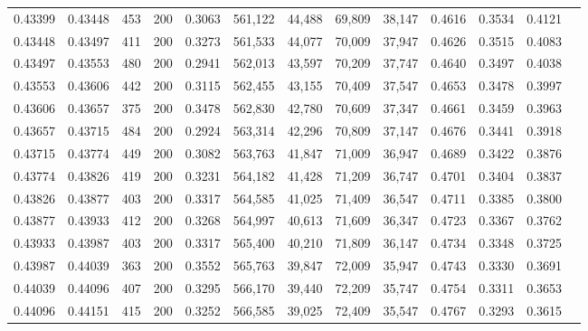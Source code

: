 \begin{tabular}{rrrrrrrrrrrrr}
0.43399 & 0.43448 &    453 & 200 &                                     0.3063 & 561,122 &  44,488 &  69,809 &  38,147 & 0.4616 & 0.3534 & 0.4121 \\
0.43448 & 0.43497 &    411 & 200 &                                     0.3273 & 561,533 &  44,077 &  70,009 &  37,947 & 0.4626 & 0.3515 & 0.4083 \\
0.43497 & 0.43553 &    480 & 200 &                                     0.2941 & 562,013 &  43,597 &  70,209 &  37,747 & 0.4640 & 0.3497 & 0.4038 \\
0.43553 & 0.43606 &    442 & 200 &                                     0.3115 & 562,455 &  43,155 &  70,409 &  37,547 & 0.4653 & 0.3478 & 0.3997 \\
0.43606 & 0.43657 &    375 & 200 &                                     0.3478 & 562,830 &  42,780 &  70,609 &  37,347 & 0.4661 & 0.3459 & 0.3963 \\
0.43657 & 0.43715 &    484 & 200 &                                     0.2924 & 563,314 &  42,296 &  70,809 &  37,147 & 0.4676 & 0.3441 & 0.3918 \\
0.43715 & 0.43774 &    449 & 200 &                                     0.3082 & 563,763 &  41,847 &  71,009 &  36,947 & 0.4689 & 0.3422 & 0.3876 \\
0.43774 & 0.43826 &    419 & 200 &                                     0.3231 & 564,182 &  41,428 &  71,209 &  36,747 & 0.4701 & 0.3404 & 0.3837 \\
0.43826 & 0.43877 &    403 & 200 &                                     0.3317 & 564,585 &  41,025 &  71,409 &  36,547 & 0.4711 & 0.3385 & 0.3800 \\
0.43877 & 0.43933 &    412 & 200 &                                     0.3268 & 564,997 &  40,613 &  71,609 &  36,347 & 0.4723 & 0.3367 & 0.3762 \\
0.43933 & 0.43987 &    403 & 200 &                                     0.3317 & 565,400 &  40,210 &  71,809 &  36,147 & 0.4734 & 0.3348 & 0.3725 \\
0.43987 & 0.44039 &    363 & 200 &                                     0.3552 & 565,763 &  39,847 &  72,009 &  35,947 & 0.4743 & 0.3330 & 0.3691 \\
0.44039 & 0.44096 &    407 & 200 &                                     0.3295 & 566,170 &  39,440 &  72,209 &  35,747 & 0.4754 & 0.3311 & 0.3653 \\
0.44096 & 0.44151 &    415 & 200 &                                     0.3252 & 566,585 &  39,025 &  72,409 &  35,547 & 0.4767 & 0.3293 & 0.3615 \\

\end{tabular}
